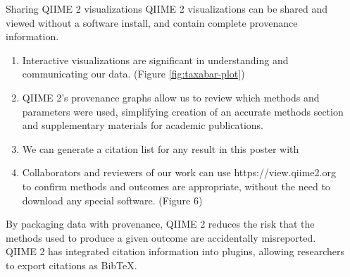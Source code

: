 \documentclass[final]{beamer}
\newlength{\sepwidth}
\newlength{\colwidth}
\newcommand{\separatorcolumn}{\begin{column}{\sepwidth}\end{column}}
\begin{document}
\begin{frame}[t]
\begin{columns}[t]
\separatorcolumn

\begin{column}{\colwidth}

    \begin{block}{Sharing QIIME 2 visualizations}
      QIIME 2 visualizations can be shared and viewed without a software
      install, and contain complete provenance information.

      \begin{enumerate}
        \item Interactive visualizations are significant in understanding and
        communicating our data. (Figure \ref{fig:taxabar-plot})
        \item QIIME 2's provenance graphs allow us to review which methods and
        parameters were used, simplifying creation of an accurate methods section
        and supplementary materials for academic publications.
        \item We can generate a citation list for any result in this poster with 
        \item Collaborators and reviewers of our work can use https://view.qiime2.org to confirm methods and outcomes are
        appropriate, without the need to download any special software. (Figure 6)
      \end{enumerate}

    \begin{tcolorbox}
    [width=\textwidth, colframe=blue]
    {By packaging data with provenance, QIIME 2 reduces the risk that the
    methods used to produce a given outcome are accidentally misreported.
    QIIME 2 has integrated citation information into plugins, allowing
    researchers to export citations as BibTeX}.
    \end{tcolorbox}



\end{block}
\end{column}
\end{columns}
\end{frame}
\end{document}
